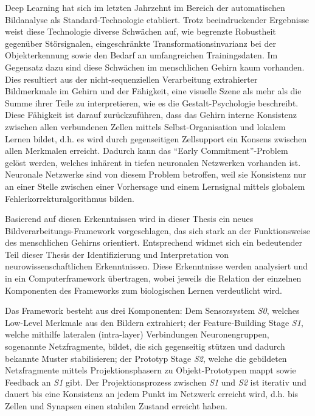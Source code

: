 Deep Learning hat sich im letzten Jahrzehnt im Bereich der automatischen Bildanalyse als Standard-Technologie etabliert.
Trotz beeindruckender Ergebnisse weist diese Technologie diverse Schwächen auf, wie begrenzte Robustheit gegenüber Störsignalen, eingeschränkte Transformationsinvarianz bei der Objekterkennung sowie den Bedarf an umfangreichen Trainingsdaten.
Im Gegensatz dazu sind diese Schwächen im menschlichen Gehirn kaum vorhanden.
Dies resultiert aus der nicht-sequenziellen Verarbeitung extrahierter Bildmerkmale im Gehirn und der Fähigkeit, eine visuelle Szene als mehr als die Summe ihrer Teile zu interpretieren, wie es die Gestalt-Psychologie beschreibt. Diese Fähigkeit ist darauf zurückzuführen, dass das Gehirn interne Konsistenz zwischen allen verbundenen Zellen mittels Selbst-Organisation und lokalem Lernen bildet, d.h. es wird durch gegenseitigen Zellsupport ein Konsens zwischen allen Merkmalen erreicht. Dadurch kann das ``Early Commitment''-Problem gelöst werden, welches inhärent in tiefen neuronalen Netzwerken vorhanden ist. Neuronale Netzwerke sind von diesem Problem betroffen, weil sie Konsistenz nur an einer Stelle zwischen einer Vorhersage und einem Lernsignal mittels globalem Fehlerkorrekturalgorithmus bilden.

Basierend auf diesen Erkenntnissen wird in dieser Thesis ein neues Bildverarbeitungs-Framework vorgeschlagen, das sich stark an der Funktionsweise des menschlichen Gehirns orientiert.
Entsprechend widmet sich ein bedeutender Teil dieser Thesis der Identifizierung und Interpretation von neurowissenschaftlichen Erkenntnissen.
Diese Erkenntnisse werden analysiert und in ein Computerframework übertragen, wobei jeweils die Relation der einzelnen Komponenten des Frameworks zum biologischen Lernen verdeutlicht wird.

Das Framework besteht aus drei Komponenten: Dem Sensorsystem \emph{S0}, welches Low-Level Merkmale aus den Bildern extrahiert; der Feature-Building Stage \emph{S1}, welche mithilfe lateralen (intra-layer) Verbindungen Neuronengruppen, sogenannte Netzfragmente, bildet, die sich gegenseitig stützen und dadurch bekannte Muster stabilisieren; der Prototyp Stage \emph{S2}, welche die gebildeten Netzfragmente  mittels Projektionsphasern zu Objekt-Prototypen mappt sowie Feedback an \emph{S1} gibt.
Der Projektionsprozess zwischen \emph{S1} und \emph{S2} ist iterativ und dauert bis eine Konsistenz an jedem Punkt im Netzwerk erreicht wird, d.h. bis Zellen und Synapsen einen stabilen Zustand erreicht haben.


